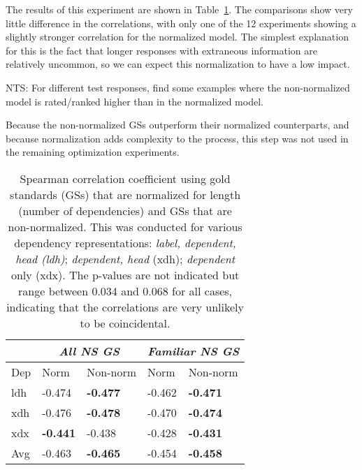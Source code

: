The results of this experiment are shown in Table~\ref{tab:normalize-responses-spearman}. The comparisons show very little difference in the correlations, with only one of the 12 experiments showing a slightly stronger correlation for the normalized model. The simplest explanation for this is the fact that longer responses with extraneous information are relatively uncommon, so we can expect this normalization to have a low impact.

\bigskip
NTS: For different test responses, find some examples where the non-normalized model is rated/ranked higher than in the normalized model.

Because the non-normalized GSs outperform their normalized counterparts, and because normalization adds complexity to the process, this step was not used in the remaining optimization experiments.


\begin{table}[htb!]
\begin{center}
\begin{tabular}{|l||l|l||l|l|}
\hline
 & \multicolumn{2}{|c||}{\textit{All NS GS}} & \multicolumn{2}{|c|}{\textit{Familiar NS GS}} \\
\hline
 Dep & Norm & Non-norm & Norm & Non-norm \\
\hline
\hline
ldh & -0.474 & \textbf{-0.477} & -0.462 & \textbf{-0.471} \\
\hline
xdh & -0.476 & \textbf{-0.478} & -0.470 & \textbf{-0.474} \\
\hline
xdx & \textbf{-0.441} & -0.438 & -0.428 & \textbf{-0.431} \\
\hline
Avg & -0.463 & \textbf{-0.465} & -0.454 & \textbf{-0.458} \\
\hline
\end{tabular}
\caption{\label{tab:normalize-responses-spearman} Spearman correlation coefficient using gold standards (GSs) that are normalized for length (number of dependencies) and GSs that are non-normalized. This was conducted for various dependency representations: \textit{label, dependent, head (ldh)}; \textit{dependent, head} (xdh); \textit{dependent} only (xdx). The p-values are not indicated but range between 0.034 and 0.068 for all cases, indicating that the correlations are very unlikely to be coincidental.}
\end{center}
\end{table}




